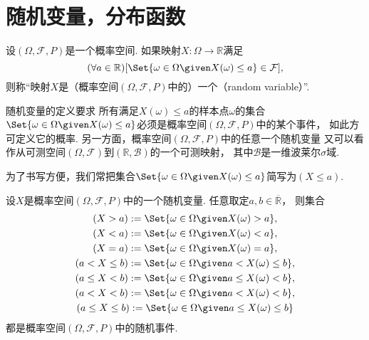 \section{随机变量，分布函数}
\begin{definition}
设\((\Omega,\mathcal{F},P)\)是一个概率空间.
如果映射\(X\colon \Omega \to \mathbb{R}\)满足\begin{equation*}
	(\forall a \in \mathbb{R})
	[
		\Set{
			\omega \in \Omega
			\given
			X(\omega) \leq a
		}
		\in \mathcal{F}
	],
\end{equation*}
则称“映射\(X\)是（概率空间\((\Omega,\mathcal{F},P)\)中的）一个（random variable）”.
\end{definition}
\begin{remark}
随机变量的定义要求
所有满足\(X(\omega) \leq a\)的样本点\(\omega\)的集合\(
	\Set{
		\omega \in \Omega
		\given
		X(\omega) \leq a
	}
\)必须是概率空间\((\Omega,\mathcal{F},P)\)中的某个事件，
如此方可定义它的概率.
另一方面，概率空间\((\Omega,\mathcal{F},P)\)中的任意一个随机变量
又可以看作从可测空间\((\Omega,\mathcal{F})\)到\((\mathbb{R},\mathcal{B})\)的一个可测映射，
其中\(\mathcal{B}\)是一维波莱尔\(\sigma\)域.
\end{remark}
\begin{remark}
为了书写方便，我们常把集合\(
	\Set{
		\omega \in \Omega
		\given
		X(\omega) \leq a
	}
\)简写为\((X \leq a)\).
\end{remark}

\begin{theorem}
设\(X\)是概率空间\((\Omega,\mathcal{F},P)\)中的一个随机变量.
任意取定\(a,b \in \overline{\mathbb{R}}\)，
则集合\begin{gather*}
	(X > a)
	\defeq
	\Set{
		\omega \in \Omega
		\given
		X(\omega) > a
	}, \\
	(X < a)
	\defeq
	\Set{
		\omega \in \Omega
		\given
		X(\omega) < a
	}, \\
	(X = a)
	\defeq
	\Set{
		\omega \in \Omega
		\given
		X(\omega) = a
	}, \\
	(a < X \leq b)
	\defeq
	\Set{
		\omega \in \Omega
		\given
		a < X(\omega) \leq b
	}, \\
	(a \leq X < b)
	\defeq
	\Set{
		\omega \in \Omega
		\given
		a \leq X(\omega) < b
	}, \\
	(a < X < b)
	\defeq
	\Set{
		\omega \in \Omega
		\given
		a < X(\omega) < b
	}, \\
	(a \leq X \leq b)
	\defeq
	\Set{
		\omega \in \Omega
		\given
		a \leq X(\omega) \leq b
	}
\end{gather*}
都是概率空间\((\Omega,\mathcal{F},P)\)中的随机事件.
\end{theorem}

